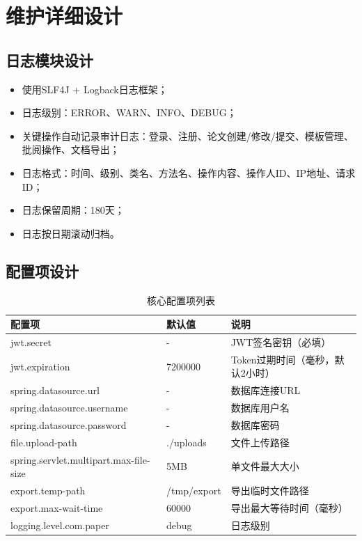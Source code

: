 \documentclass{../template/softeng}
\begin{document}
	\section{维护详细设计}

	\subsection{日志模块设计}
	\begin{itemize}
		\item 使用SLF4J + Logback日志框架；
		\item 日志级别：ERROR、WARN、INFO、DEBUG；
		\item 关键操作自动记录审计日志：登录、注册、论文创建/修改/提交、模板管理、批阅操作、文档导出；
		\item 日志格式：时间、级别、类名、方法名、操作内容、操作人ID、IP地址、请求ID；
		\item 日志保留周期：180天；
		\item 日志按日期滚动归档。
	\end{itemize}

	\subsection{配置项设计}
	\begin{table}[htbp]
		\centering
		\caption{核心配置项列表}
		\begin{tabular}{|p{5cm}|p{3cm}|p{3cm}|}
			\hline
			\textbf{配置项} & \textbf{默认值} & \textbf{说明} \\
			\hline
			jwt.secret & - & JWT签名密钥（必填） \\
			jwt.expiration & 7200000 & Token过期时间（毫秒，默认2小时） \\
			spring.datasource.url & - & 数据库连接URL \\
			spring.datasource.username & - & 数据库用户名 \\
			spring.datasource.password & - & 数据库密码 \\
			file.upload-path & ./uploads & 文件上传路径 \\
			spring.servlet.multipart.max-file-size & 5MB & 单文件最大大小 \\
			export.temp-path & /tmp/export & 导出临时文件路径 \\
			export.max-wait-time & 60000 & 导出最大等待时间（毫秒） \\
			logging.level.com.paper & debug & 日志级别 \\
			\hline
		\end{tabular}
	\end{table}
\end{document}
